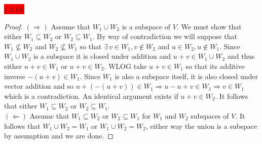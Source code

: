 \documentclass{exam}
\begin{document}
  \colorbox{red}{\underline{$1.3.19$}:}
  \begin{solution}
    \begin{proof}
      $(\Rightarrow)$ Assume that $W_1 \cup W_2$ is a subspace of $V$. We must show that either $W_1 \subseteq W_2$ or $W_2 \subseteq W_1$. By way of contradiction we will suppose that $W_1 \not\subseteq W_2$ and $W_2 \not\subseteq W_1$ so that $\exists\, v \in W_1, v \not\in W_2$ and $u \in W_2, u \not\in W_1$. Since $W_1 \cup W_2$ is a subspace it is closed under addition and $u + v \in W_1 \cup W_2$ and thus either $u + v \in W_1$ or $u + v \in W_2$. WLOG take $u + v \in W_1$ so that its additive inverse $-(u + v) \in W_1$. Since $W_1$ is also a subspace itself, it is also closed under vector addition and so $u + (-(u + v)) \in W_1 \Rightarrow u - u + v \in W_1 \Rightarrow v \in W_1$ which is a contradiction. An identical argument exists if $u + v \in W_2$. It follows that either $W_1 \subseteq W_2$ or $W_2 \subseteq W_1$. \\
      $(\Leftarrow)$ Assume that $W_1 \subseteq W_2$ or $W_2 \subseteq W_1$ for $W_1$ and $W_2$ subspaces of $V$. It follows that $W_1 \cup W_2 = W_1$ or $W_1 \cup W_2 = W_2$, either way the union is a subspace by assumption and we are done. 
    \end{proof}
  \end{solution}
\end{document}
